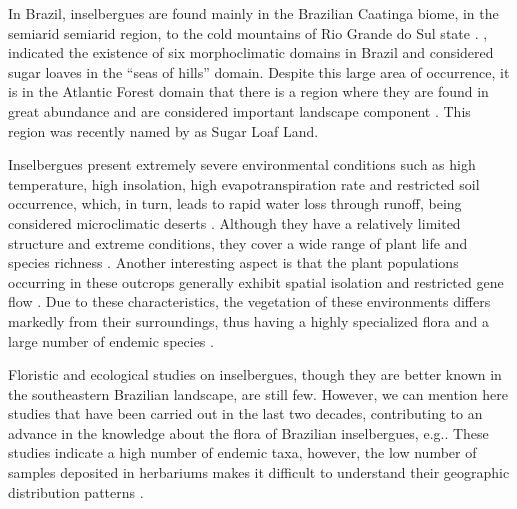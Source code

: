 In Brazil, inselbergues are found mainly in the Brazilian Caatinga biome, in the semiarid semiarid region, to the cold mountains of Rio Grande do Sul state \citep{safford2000SoutheastBrazil}. \cite{absaber1967DominiosMorfoclimaticosProvincias}, indicated the existence of six morphoclimatic domains in Brazil and considered sugar loaves in the “seas of hills” domain. Despite this large area of occurrence, it is in the Atlantic Forest domain that there is a region where they are found in great abundance and are considered important landscape component \citep{porembski2007TropicalInselbergsHabitat}. This region was recently named by \cite{depaula2016SugarLoafLand} as Sugar Loaf Land.

Inselbergues present extremely severe environmental conditions such as high temperature, high insolation, high evapotranspiration rate and restricted soil occurrence, which, in turn, leads to rapid water loss through runoff, being considered microclimatic deserts \citep{luttge2007PhysiologicalEcologyTropical, porembski2007TropicalInselbergsHabitat}. Although they have a relatively limited structure and extreme conditions, they cover a wide range of plant life and species richness \citep{porembski1998DiversityEcologySaxicolous, barthlott2000WhyStudyInselbergs, porembski2000InvasibilityTropicalGranite, bremer2000InselbergsGeomorphologyGeoecology}. Another interesting aspect is that the plant populations occurring in these outcrops generally exhibit spatial isolation and restricted gene flow \citep{barbara2008WithinpopulationSpatialGenetic, boisselier-dubayle2010GeneticStructureXerophilous, hmeljevski2017PlantPopulationsDistinct}. Due to these characteristics, the vegetation of these environments differs markedly from their surroundings, thus having a highly specialized flora and a large number of endemic species \citep{porembski1998DiversityEcologySaxicolous, porembski2007TropicalInselbergsHabitat}.

Floristic and ecological studies on inselbergues, though they are better known in the southeastern Brazilian landscape, are still few. However, we can mention here studies that have been carried out in the last two decades, contributing to an advance in the knowledge about the flora of Brazilian inselbergues, e.g.\citep{meirelles1999VegetationGraniteRock, parmentier2009ImpactEcologicalDifferentiation,porembski2007TropicalInselbergsHabitat, santos2010EstruturaVegetacaoArbustivoherbacea, depaula2016SugarLoafLand, paula2017FloristicEcologicalCharacterization}. These studies indicate a high number of endemic taxa, however, the low number of samples deposited in herbariums makes it difficult to understand their geographic distribution patterns \citep{depaula2016SugarLoafLand}.

